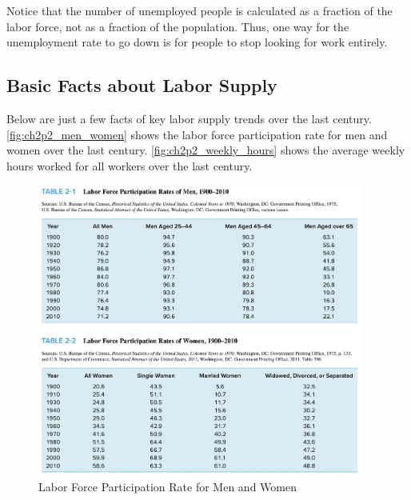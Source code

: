 Notice that the number of unemployed people is 
calculated as a fraction of the labor force,
not as a fraction of the population. Thus, one 
way for the unemployment rate to go down is 
for people to stop looking for work entirely.

\subsection{Basic Facts about Labor Supply}

Below are just a few facts of key labor supply trends
over the last century.
\autoref{fig:ch2p2_men_women}
shows the labor force participation rate
for men and women over the last century.
\autoref{fig:ch2p2_weekly_hours}
shows the average weekly hours worked
for all workers over the last century.

\FloatBarrier

\begin{figure}[!htb]
    \centering
        \includegraphics[width=0.95\textwidth]{../input/ch_2_tables_1_and_2.png}
    \caption{Labor Force Participation Rate for Men and Women}
    \label{fig:ch2p2_men_women}
\end{figure}

